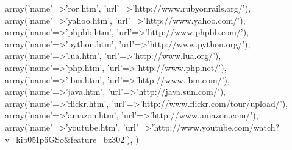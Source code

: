 \begin{DoxyCode}
    array(\textcolor{stringliteral}{'name'}=>\textcolor{stringliteral}{'ror.htm'},            \textcolor{stringliteral}{'url'}=>\textcolor{stringliteral}{'http://www.rubyonrails.org/'}),
    array(\textcolor{stringliteral}{'name'}=>\textcolor{stringliteral}{'yahoo.htm'},          \textcolor{stringliteral}{'url'}=>\textcolor{stringliteral}{'http://www.yahoo.com/'}),
    array(\textcolor{stringliteral}{'name'}=>\textcolor{stringliteral}{'phpbb.htm'},          \textcolor{stringliteral}{'url'}=>\textcolor{stringliteral}{'http://www.phpbb.com/'}),
    array(\textcolor{stringliteral}{'name'}=>\textcolor{stringliteral}{'python.htm'},         \textcolor{stringliteral}{'url'}=>\textcolor{stringliteral}{'http://www.python.org/'}),
    array(\textcolor{stringliteral}{'name'}=>\textcolor{stringliteral}{'lua.htm'},            \textcolor{stringliteral}{'url'}=>\textcolor{stringliteral}{'http://www.lua.org/'}),
    array(\textcolor{stringliteral}{'name'}=>\textcolor{stringliteral}{'php.htm'},            \textcolor{stringliteral}{'url'}=>\textcolor{stringliteral}{'http://www.php.net/'}),
    array(\textcolor{stringliteral}{'name'}=>\textcolor{stringliteral}{'ibm.htm'},            \textcolor{stringliteral}{'url'}=>\textcolor{stringliteral}{'http://www.ibm.com/'}),
    array(\textcolor{stringliteral}{'name'}=>\textcolor{stringliteral}{'java.htm'},           \textcolor{stringliteral}{'url'}=>\textcolor{stringliteral}{'http://java.sun.com/'}),
    array(\textcolor{stringliteral}{'name'}=>\textcolor{stringliteral}{'flickr.htm'},         \textcolor{stringliteral}{'url'}=>\textcolor{stringliteral}{'http://www.flickr.com/tour/upload/'}),
    array(\textcolor{stringliteral}{'name'}=>\textcolor{stringliteral}{'amazon.htm'},         \textcolor{stringliteral}{'url'}=>\textcolor{stringliteral}{'http://www.amazon.com/'}),
    array(\textcolor{stringliteral}{'name'}=>\textcolor{stringliteral}{'youtube.htm'},        \textcolor{stringliteral}{'url'}=>\textcolor{stringliteral}{'http://www.youtube.com/watch?v=kib05Ip6GSo&feature=bz302'}),
)
\end{DoxyCode}
